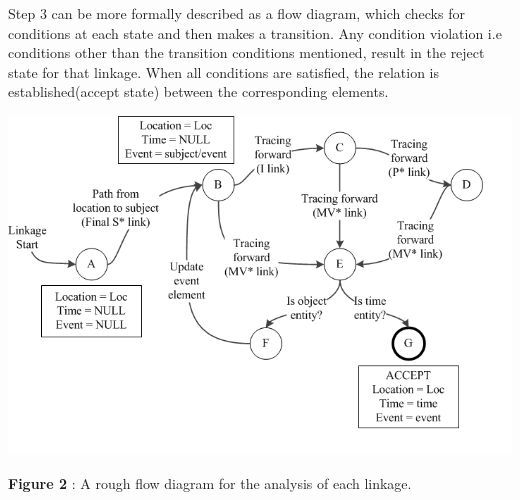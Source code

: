 \documentclass[runningheads,a4paper,11pt]{llncs}
\begin{document}
Step 3 can be more formally described as a flow diagram, which checks for conditions at each state and then makes a transition. Any condition violation i.e 
conditions other than the transition conditions mentioned, result
in the reject state for that linkage. When all conditions are satisfied, the relation is established(accept state) between the corresponding elements. \newline

\includegraphics[scale=0.5]{flow_diagram.png}
 \begin{center}
  {\bf Figure 2} : A rough flow diagram for the analysis of each linkage.
 \end{center}
 
\end{document}
